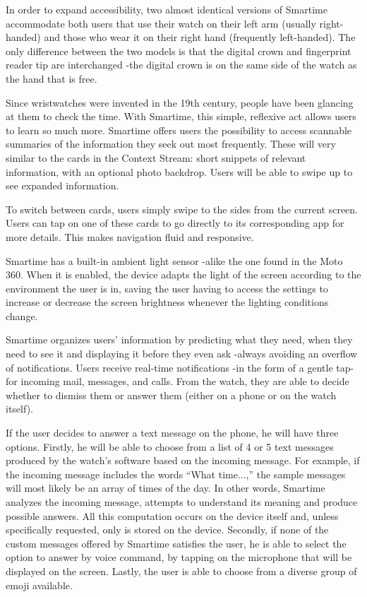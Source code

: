 \documentclass{article}
\begin{document}
In order to expand accessibility, two almost identical versions of Smartime accommodate both users that use their watch on their left arm (usually right-handed) and those who wear it on their right hand (frequently left-handed). The only difference between the two models is that the digital crown and fingerprint reader tip are interchanged -the digital crown is on the same side of the watch as the hand that is free.

Since wristwatches were invented in the 19th century, people have been glancing at them to check the time. With Smartime, this simple, reflexive act allows users to learn so much more. Smartime offers users the possibility to access scannable summaries of the information they seek out most frequently. These will very similar to the cards in the Context Stream: short snippets of relevant information, with an optional photo backdrop. Users will be able to swipe up to see expanded information.

 To switch between cards, users simply swipe to the sides from the current screen. Users can tap on one of these cards to go directly to its corresponding app for more details. This makes navigation fluid and responsive.

Smartime has a built-in ambient light sensor -alike the one found in the Moto 360. When it is enabled, the device adapts the light of the screen according to the environment the user is in, saving the user having to access the settings to increase or decrease the screen brightness whenever the lighting conditions change.
 
Smartime organizes users' information by predicting what they need, when they need to see it and displaying it before they even ask -always avoiding an overflow of notifications.  Users receive real-time notifications -in the form of a gentle tap- for incoming mail, messages, and calls. From the watch, they are able to decide whether to dismiss them or answer them (either on a phone or on the watch itself).

If the user decides to answer a text message on the phone, he will have three options. Firstly, he will be able to choose from a list of 4 or 5 text messages produced by the watch's software based on the incoming message. For example, if the incoming message includes the words ``What time...,'' the sample messages will most likely be an array of times of the day. In other words, Smartime analyzes the incoming message, attempts to understand its meaning and produce possible answers. All this computation occurs on the device itself and, unless specifically requested, only is stored on the device.  Secondly, if none of the custom messages offered by Smartime satisfies the user, he is able to select the option to answer by voice command, by tapping on the microphone that will be displayed on the screen. Lastly, the user is able to choose from a diverse group of emoji available.
 
\end{document}
